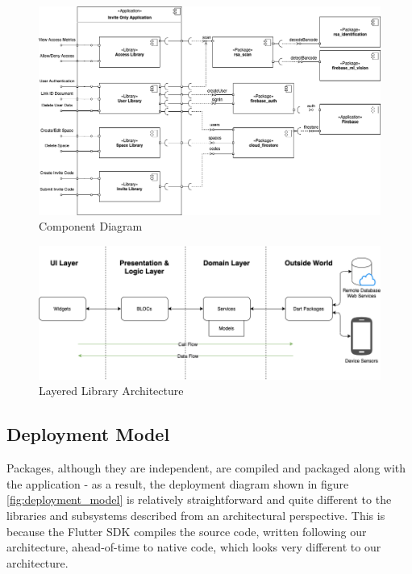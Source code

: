 \begin{figure}[H]
  \centering
  \includegraphics[width=1.0\textwidth]{documentation/software_requirements_specification/architecture/component_diagram.png}
  \caption{Component Diagram}
  \label{fig:invite_only_component}
\end{figure}

\begin{figure}[H]
  \centering
  \includegraphics[width=1.0\textwidth]{documentation/software_requirements_specification/architecture/library_architecture.png}
  \caption{Layered Library Architecture}
  \label{fig:library_architecture}
\end{figure}

\newpage

\subsection{Deployment Model}

Packages, although they are independent, are compiled and packaged along with the application - as a result, the deployment diagram shown in figure \ref{fig:deployment_model} is relatively straightforward and quite different to the libraries and subsystems described from an architectural perspective. This is because the Flutter SDK compiles the source code, written following our architecture, ahead-of-time to native code, which looks very different to our architecture.

